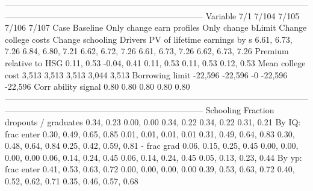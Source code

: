 -----------------------------------------------------------------------------------------------------------------------------------------------------------------------------------
                              Variable                          7/1                        7/104                    7/105                        7/106                        7/107
                                  Case                     Baseline    Only change earn profiles       Only change bLimit         Change college costs             Change schooling
                               Drivers                                                                                                                                             
          PV of lifetime earnings by s             6.61, 6.73, 7.26             6.84, 6.80, 7.21         6.62, 6.72, 7.26             6.61, 6.73, 7.26             6.62, 6.73, 7.26
               Premium relative to HSG                   0.11, 0.53                  -0.04, 0.41               0.11, 0.53                   0.11, 0.53                   0.12, 0.53
                     Mean college cost                        3,513                        3,513                    3,513                        3,044                        3,513
                       Borrowing limit                      -22,596                      -22,596                       -0                      -22,596                      -22,596
                   Corr ability signal                         0.80                         0.80                     0.80                         0.80                         0.80
-----------------------------------------------------------------------------------------------------------------------------------------------------------------------------------
                             Schooling                                                                                                                                             
         Fraction dropouts / graduates                   0.34, 0.23                   0.00, 0.00               0.34, 0.22                   0.34, 0.22                   0.31, 0.21
                     By IQ: frac enter       0.30, 0.49, 0.65, 0.85       0.01, 0.01, 0.01, 0.01   0.31, 0.49, 0.64, 0.83       0.30, 0.48, 0.64, 0.84       0.25, 0.42, 0.59, 0.81
                           - frac grad       0.06, 0.15, 0.25, 0.45       0.00, 0.00, 0.00, 0.00   0.06, 0.14, 0.24, 0.45       0.06, 0.14, 0.24, 0.45       0.05, 0.13, 0.23, 0.44
                     By yp: frac enter       0.41, 0.53, 0.63, 0.72       0.00, 0.00, 0.00, 0.00   0.39, 0.53, 0.63, 0.72       0.40, 0.52, 0.62, 0.71       0.35, 0.46, 0.57, 0.68
